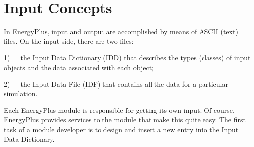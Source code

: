 \chapter{Input Concepts}\label{input-concepts}

In EnergyPlus, input and output are accomplished by means of ASCII (text) files. On the input side, there are two files:

1)~~~the Input Data Dictionary (IDD) that describes the types (classes) of input objects and the data associated with each object;

2)~~~the Input Data File (IDF) that contains all the data for a particular simulation.

Each EnergyPlus module is responsible for getting its own input. Of course, EnergyPlus provides services to the module that make this quite easy. The first task of a module developer is to design and insert a new entry into the Input Data Dictionary.
